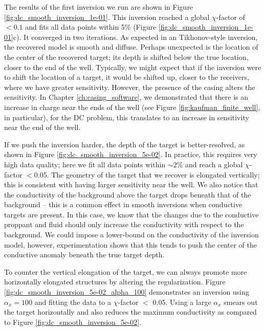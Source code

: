 The results of the first inversion we run are shown in Figure \ref{fig:dc_smooth_inversion_1e-01}. This inversion reached a global $\chi$-factor of $<0.1$ and fits all data points within 5\% (Figure \ref{fig:dc_smooth_inversion_1e-01}c). It converged in two iterations. As expected in an Tikhonov-style inversion, the recovered model is smooth and diffuse. Perhaps unexpected is the location of the center of the recovered target; its depth is shifted below the true location, closer to the end of the well. Typically, we might expect that if the inversion were to shift the location of a target, it would be shifted up, closer to the receivers, where we have greater sensitivity. However, the presence of the casing alters the sensitivity. In Chapter \ref{ch:casing_software}, we demonstrated that there is an increase in charge near the ends of the well (see Figure \ref{fig:kaufman_finite_well}, in particular), for the DC problem, this translates to an increase in sensitivity near the end of the well.






If we push the inversion harder, the depth of the target is better-resolved, as shown in Figure \ref{fig:dc_smooth_inversion_5e-02}. In practice, this requires very high data quality; here we fit all data points within $\sim2\%$ and reach a global $\chi$-factor $<$0.05. The geometry of the target that we recover is elongated vertically; this is consistent with having larger sensitivity near the well. We also notice that the conductivity of the background above the target drops beneath that of the background -- this is a common effect in smooth inversions when conductive targets are present. In this case, we know that the changes due to the conductive proppant and fluid should only increase the conductivity with respect to the background. We could impose a lower-bound on the conductivity of the inversion model, however, experimentation shows that this tends to push the center of the conductive anomaly beneath the true target depth.




To counter the vertical elongation of the target, we can always promote more horizontally elongated structures by altering the regularization. Figure \ref{fig:dc_smooth_inversion_5e-02_alpha_100} demonstrates an inversion using $\alpha_x=100$ and fitting the data to a $\chi$-factor $<$ 0.05. Using a large $\alpha_x$ smears out the target horizontally and also reduces the maximum conductivity as compared to Figure \ref{fig:dc_smooth_inversion_5e-02}.


